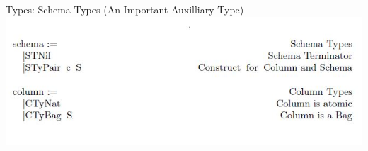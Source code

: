 \begin{frame}{Types: Schema Types (An Important Auxilliary Type)}
\centering
%
%
\includegraphics[scale=0.6]{Images/Grammar/Schema.JPG}
\end{frame}

